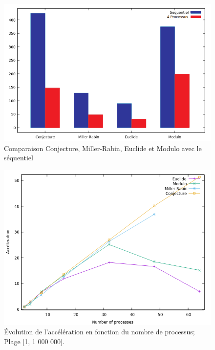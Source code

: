 	\begin{frame}
	\begin{figure}[!ht]	
		\begin{center}\includegraphics[scale=0.4]{Bar1.png}\end{center}
		\caption{Comparaison Conjecture, Miller-Rabin, Euclide et Modulo avec le séquentiel}
		\label{fg:fig3}
	\end{figure}	
	\end{frame}
		
	\begin{frame}
	\begin{figure}[!ht]	
		\begin{center}\includegraphics[scale=0.55]{Acc_All_1M_v2.png}\end{center}
		\caption{Évolution de l’accélération en fonction du nombre de processus; Plage [1, 1 000 000].}
		\label{fg:fig4}
	\end{figure}	
	\end{frame}
	
